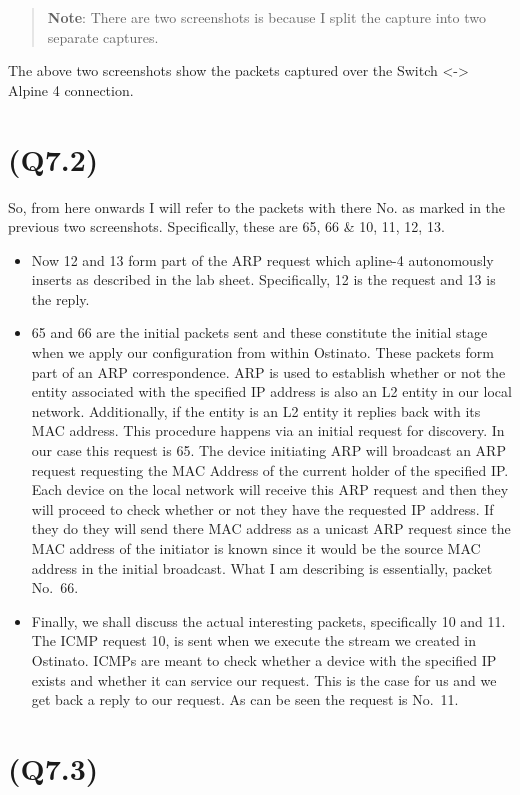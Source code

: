 \begin{quote}
\textbf{Note}: There are two screenshots is because I split the capture
into two separate captures.
\end{quote}

The above two screenshots show the packets captured over the Switch
\textless-\textgreater{} Alpine 4 connection.

\hypertarget{q7.2}{%
\section{(Q7.2)}\label{q7.2}}

So, from here onwards I will refer to the packets with there No. as
marked in the previous two screenshots. Specifically, these are 65, 66
\& 10, 11, 12, 13.

\begin{itemize}
\item
  Now 12 and 13 form part of the ARP request which apline-4 autonomously
  inserts as described in the lab sheet. Specifically, 12 is the request
  and 13 is the reply.
\item
  65 and 66 are the initial packets sent and these constitute the
  initial stage when we apply our configuration from within Ostinato.
  These packets form part of an ARP correspondence. ARP is used to
  establish whether or not the entity associated with the specified IP
  address is also an L2 entity in our local network. Additionally, if
  the entity is an L2 entity it replies back with its MAC address. This
  procedure happens via an initial request for discovery. In our case
  this request is 65. The device initiating ARP will broadcast an ARP
  request requesting the MAC Address of the current holder of the
  specified IP. Each device on the local network will receive this ARP
  request and then they will proceed to check whether or not they have
  the requested IP address. If they do they will send there MAC address
  as a unicast ARP request since the MAC address of the initiator is
  known since it would be the source MAC address in the initial
  broadcast. What I am describing is essentially, packet No.~66.
\item
  Finally, we shall discuss the actual interesting packets, specifically
  10 and 11. The ICMP request 10, is sent when we execute the stream we
  created in Ostinato. ICMPs are meant to check whether a device with
  the specified IP exists and whether it can service our request. This
  is the case for us and we get back a reply to our request. As can be
  seen the request is No.~11.
\end{itemize}

\hypertarget{q7.3}{%
\section{(Q7.3)}\label{q7.3}}

